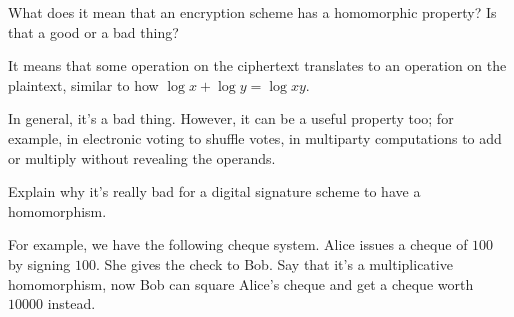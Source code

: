 \question[3]
What does it mean that an encryption scheme has a homomorphic property?
Is that a good or a bad thing?

\begin{solution}
  It means that some operation on the ciphertext translates to an operation on 
  the plaintext, similar to how \(\log x + \log y = \log xy\).

  In general, it's a bad thing.
  However, it can be a useful property too; for example, in electronic voting 
  to shuffle votes, in multiparty computations to add or multiply without 
  revealing the operands.
\end{solution}


\question[3]
Explain why it's really bad for a digital signature scheme to have a 
homomorphism.

\begin{solution}
  For example, we have the following cheque system.
  Alice issues a cheque of \(100\) by signing \(100\).
  She gives the check to Bob.
  Say that it's a multiplicative homomorphism, now Bob can square Alice's 
  cheque and get a cheque worth \(10000\) instead.
\end{solution}
